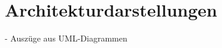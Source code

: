 
\chapter{Architekturdarstellungen} %
\label{cha:architekturdarstellungen}

  - Auszüge aus UML-Diagrammen

